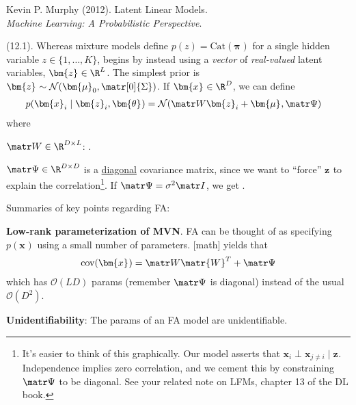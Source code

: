 \documentclass[11pt]{article}
\renewcommand\vec[2][]{\bm{#2}_{#1}}
\newcommand\p{\Needspace{10\baselineskip} \noindent}
\begin{document}

\vspace{-1.7em}
{\scriptsize Kevin P. Murphy (2012). Latent Linear Models.\\ \textit{Machine Learning: A Probabilistic Perspective}.\\ }

\p {} (12.1). Whereas mixture models define $p(z) = \text{Cat}(\vec\pi)$ for a single hidden variable $z \in \{1, \ldots, K\}$,  begins by instead using a \textit{vector} of \textit{real-valued} latent variables, $\vec z \in \R^{L}$. The simplest prior is $\vec z \sim \mathcal{N}(\vec[0]{\mu}, \matr[0]{\Sigma})$. If $\vec x \in \R^D$, we can define
\begin{align}
	p(\vec[i]{x}\mid \vec[i]{z}, \vec\theta)
		&= \mathcal{N}(\matr W \vec[i]{z} + \vec\mu, \matr\Psi)
\end{align}
where
\begin{compactitem}
	\item $\matr W \in \R^{D \times L}$: .
	
	\item $\matr\Psi \in \R^{D \times D}$ is a \underline{diagonal} covariance matrix, since we want to ``force'' $\vec{z}$ to explain the correlation\footnote{It's easier to think of this graphically. Our model asserts that $\vec[i]{x} \perp \vec[j\ne i]{x} \mid \vec{z}$. Independence implies zero correlation, and we cement this by constraining $\matr\Psi$ to be diagonal. See your related note on LFMs, chapter 13 of the DL book.}. If $\matr\Psi  = \sigma^2 \matr I$, we get . 
\end{compactitem}
Summaries of key points regarding FA:
\begin{compactitem}
	\item \textbf{Low-rank parameterization of MVN}. FA can be thought of as specifying $p(\vec x)$ using a small number of parameters. [math] yields that
	$$
	\text{cov}(\vec x) = \matr W \matr{W}^T + \matr\Psi
	$$
	which has $\mathcal{O}(LD)$ params (remember $\matr\Psi$ is diagonal) instead of the usual $\mathcal{O}(D^2)$. 
	
	\item \textbf{Unidentifiability}: The params of an FA model are unidentifiable. 
\end{compactitem}
\end{document}
